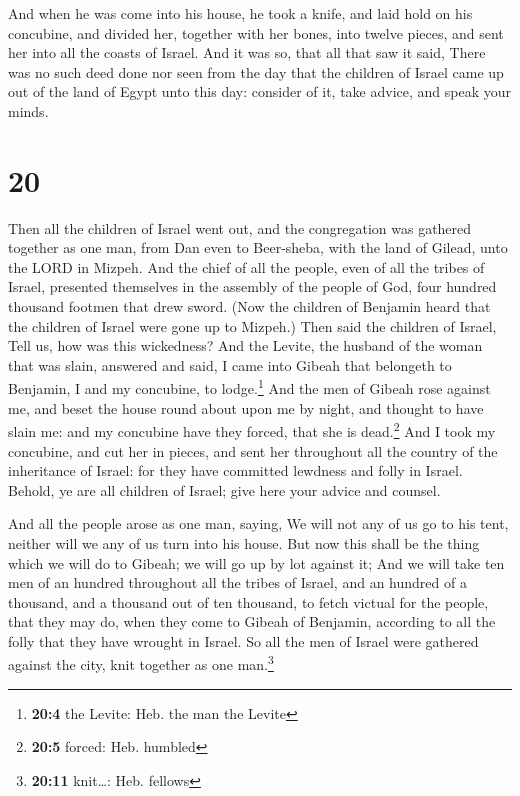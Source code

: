  And when he was come into his house, he took a knife,
and laid hold on his concubine, and divided her, together with her
bones, into twelve pieces, and sent her into all the coasts of Israel.
 And it was so, that all that saw it said, There was no
such deed done nor seen from the day that the children of Israel came up
out of the land of Egypt unto this day: consider of it, take advice, and
speak your minds.

\hypertarget{section-19}{%
\section{20}\label{section-19}}

 Then all the children of Israel went out, and the
congregation was gathered together as one man, from Dan even to
Beer-sheba, with the land of Gilead, unto the LORD in Mizpeh.
 And the chief of all the people, even of all the tribes
of Israel, presented themselves in the assembly of the people of God,
four hundred thousand footmen that drew sword.  (Now the
children of Benjamin heard that the children of Israel were gone up to
Mizpeh.) Then said the children of Israel, Tell us, how was this
wickedness?  And the Levite, the husband of the woman that
was slain, answered and said, I came into Gibeah that belongeth to
Benjamin, I and my concubine, to lodge.\footnote{\textbf{20:4} the
  Levite: Heb. the man the Levite}  And the men of Gibeah
rose against me, and beset the house round about upon me by night, and
thought to have slain me: and my concubine have they forced, that she is
dead.\footnote{\textbf{20:5} forced: Heb. humbled}  And I
took my concubine, and cut her in pieces, and sent her throughout all
the country of the inheritance of Israel: for they have committed
lewdness and folly in Israel.  Behold, ye are all children
of Israel; give here your advice and counsel.

 And all the people arose as one man, saying, We will not
any of us go to his tent, neither will we any of us turn into his house.
 But now this shall be the thing which we will do to
Gibeah; we will go up by lot against it;  And we will
take ten men of an hundred throughout all the tribes of Israel, and an
hundred of a thousand, and a thousand out of ten thousand, to fetch
victual for the people, that they may do, when they come to Gibeah of
Benjamin, according to all the folly that they have wrought in Israel.
 So all the men of Israel were gathered against the city,
knit together as one man.\footnote{\textbf{20:11} knit\ldots: Heb.
  fellows}

